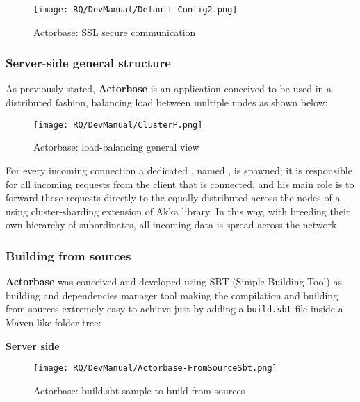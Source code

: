 \documentclass{scalatekids-article}
\begin{document}
\begin{figure}[H]
	\begin{center}
		\texttt{[image: RQ/DevManual/Default-Config2.png]}
		\caption{Actorbase: SSL secure communication}
	\end{center}
\end{figure}

\newpage
\subsubsection{Server-side general structure}

As previously stated, \textbf{Actorbase} is an application conceived to be used in a distributed fashion,
balancing load between multiple nodes as shown below:

\begin{figure}[H]
  \begin{center}
    \texttt{[image: RQ/DevManual/ClusterP.png]}
    \caption{Actorbase: load-balancing general view}
  \end{center}
\end{figure}

For every incoming connection a dedicated , named
, is spawned; it is responsible for all incoming requests
from the client that is connected, and his main role is to forward these
requests directly to the   equally distributed across
the nodes of a  using cluster-sharding extension of Akka library.
In this way, with   breeding their own hierarchy of
subordinates, all incoming data is spread across the  network.

\subsubsection{Building from sources}

\textbf{Actorbase} was conceived and developed using SBT (Simple Building Tool)
as building and dependencies manager tool making the compilation and building
from sources extremely easy to achieve just by adding a \verb=build.sbt= file
inside a Maven-like folder tree:

\textbf{Server side}

\begin{figure}[H]
  \begin{center}
    \texttt{[image: RQ/DevManual/Actorbase-FromSourceSbt.png]}
    \caption{Actorbase: build.sbt sample to build from sources}
  \end{center}
\end{figure}
\end{document}
